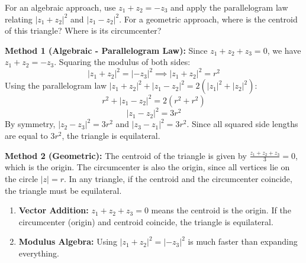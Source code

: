 \begin{hint}
For an algebraic approach, use $z_1+z_2 = -z_3$ and apply the parallelogram law relating $|z_1+z_2|^2$ and $|z_1-z_2|^2$.
For a geometric approach, where is the centroid of this triangle? Where is its circumcenter?
\end{hint}

\begin{solution}
\textbf{Method 1 (Algebraic - Parallelogram Law):}
Since $z_1 + z_2 + z_3 = 0$, we have $z_1 + z_2 = -z_3$. 
Squaring the modulus of both sides:
\[ |z_1+z_2|^2 = |-z_3|^2 \implies |z_1+z_2|^2 = r^2 \]
Using the parallelogram law $|z_1+z_2|^2 + |z_1-z_2|^2 = 2(|z_1|^2+|z_2|^2)$:
\[ r^2 + |z_1-z_2|^2 = 2(r^2 + r^2) \]
\[ |z_1-z_2|^2 = 3r^2 \]
By symmetry, $|z_2-z_3|^2 = 3r^2$ and $|z_3-z_1|^2 = 3r^2$.
Since all squared side lengths are equal to $3r^2$, the triangle is equilateral.

\textbf{Method 2 (Geometric):}
The centroid of the triangle is given by $\frac{z_1+z_2+z_3}{3} = 0$, which is the origin.
The circumcenter is also the origin, since all vertices lie on the circle $|z|=r$.
In any triangle, if the centroid and the circumcenter coincide, the triangle must be equilateral.
\end{solution}

\begin{takeaways}
\begin{enumerate}
    \item \textbf{Vector Addition:} $z_1+z_2+z_3=0$ means the centroid is the origin. If the circumcenter (origin) and centroid coincide, the triangle is equilateral.
    \item \textbf{Modulus Algebra:} Using $|z_1+z_2|^2 = |-z_3|^2$ is much faster than expanding everything.
\end{enumerate}
\end{takeaways}

